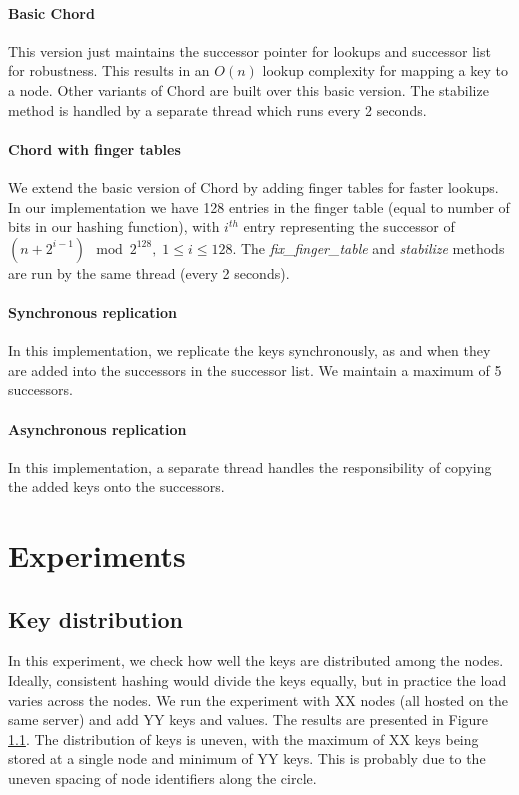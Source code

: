 \documentclass{sig-alternate-10pt}
\begin{document}
\paragraph{Basic Chord}
This version just maintains the successor pointer for lookups and successor list for robustness. This results in an $O(n)$ lookup complexity for mapping a key to a node. Other variants of Chord are built over this basic version. The stabilize method is handled by a separate thread which runs every 2 seconds.

\paragraph{Chord with finger tables}
We extend the basic version of Chord by adding finger tables for faster lookups. In our implementation we have 128 entries in the finger table (equal to number of bits in our hashing function), with $i^{th}$ entry representing the successor of $(n + 2^{i - 1}) \mod 2^{128},\; 1 \leq i \leq 128$. The \textit{fix\_finger\_table} and \textit{stabilize} methods are run by the same thread (every 2 seconds).

\paragraph{Synchronous replication}
In this implementation, we replicate the keys synchronously, as and when they are added into the successors in the successor list. We maintain a maximum of 5 successors.

\paragraph{Asynchronous replication}
In this implementation, a separate thread handles the responsibility of copying the added keys onto the successors.

\section{Experiments}
\subsection{Key distribution}
In this experiment, we check how well the keys are distributed among the nodes. Ideally, consistent hashing would divide the keys equally, but in practice the load varies across the nodes. We run the experiment with XX nodes (all hosted on the same server) and add YY keys and values. The results are presented in Figure \ref{}. The distribution of keys is uneven, with the maximum of XX keys being stored at a single node and minimum of YY keys. This is probably due to the uneven spacing of node identifiers along the circle.
\end{document}
